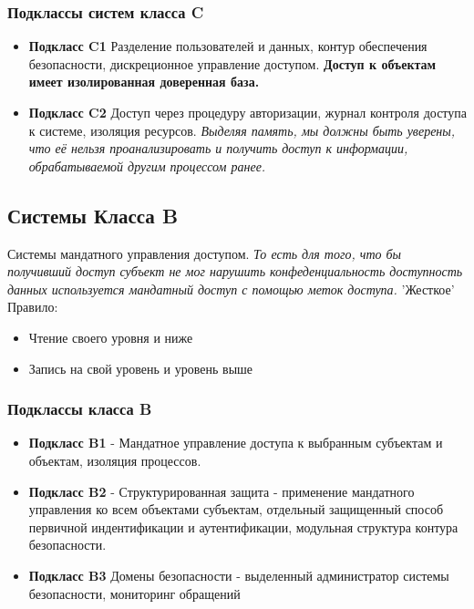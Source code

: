 \documentclass{article}
\begin{document}
    \subsubsection{Подклассы систем класса C}
    
    \begin{itemize}
        \item \textbf{Подкласс C1} Разделение пользователей и данных, контур обеспечения безопасности, 
        дискреционное управление доступом.
        \newline \textbf{Доступ к объектам имеет изолированная доверенная база.}
        \item \textbf{Подкласс C2} Доступ через процедуру авторизации, журнал контроля доступа к системе, изоляция ресурсов.
        \newline \textit{Выделяя память, мы должны быть уверены, что её нельзя проанализировать и получить доступ к информации, обрабатываемой другим процессом ранее.}
    \end{itemize}
    
    \subsection{Системы Класса B}
    Системы мандатного управления доступом.
    \textit{\newline То есть для того, что бы получивший доступ субъект не мог нарушить конфеденциальность доступность данных используется мандатный доступ с помощью меток доступа.}
    \newline'Жесткое' Правило:
    \begin{itemize}
        \item Чтение своего уровня и ниже
        \item Запись на свой уровень и уровень выше
    \end{itemize}
    
    \subsubsection{Подклассы класса B}
    
    \begin{itemize}
        \item \textbf{Подкласс B1} - Мандатное управление доступа к выбранным субъектам и объектам, изоляция процессов. 
        \item \textbf{Подкласс B2} - Структурированная защита - применение мандатного управления ко всем объектами субъектам, отдельный защищенный способ первичной индентификации и аутентификации, модульная структура контура безопасности.
        \item \textbf{Подкласс B3} Домены безопасности - выделенный администратор системы безопасности, мониторинг обращений
    \end{itemize}
    
\end{document}
